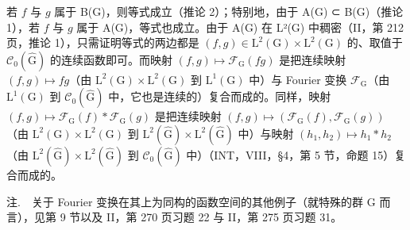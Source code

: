 若 \(f\) 与 \(g\) 属于 B(G)，则等式成立（推论 2）；特别地，由于 A(G) ⊂ B(G)（推论 1），若 \(f\) 与 \(g\) 属于 A(G)，等式也成立。由于 A(G) 在 L²(G) 中稠密（II，第 212 页，推论 1），只需证明等式的两边都是 \((f,g)\in\mathrm{L}^{2}(\mathrm{G})\times\mathrm{L}^{2}(\mathrm{G})\) 的、取值于 \(\mathcal{C}_{0}(\widehat{\mathrm{G}})\) 的连续函数即可。而映射 \((f,g)\mapsto\mathcal{F}_{\mathrm{G}}(fg)\) 是把连续映射 \((f,g)\mapsto fg\)（由 \(\mathrm{L}^{2}(\mathrm{G})\times\mathrm{L}^{2}(\mathrm{G})\) 到 \(\mathrm{L}^{1}(\mathrm{G})\) 中）与 Fourier 变换 \(\mathcal{F}_{\mathrm{G}}\)（由 \(\mathrm{L}^{1}(\mathrm{G})\) 到 \(\mathcal{C}_{0}(\widehat{\mathrm{G}})\) 中，它也是连续的）复合而成的。同样，映射 \((f,g)\mapsto\mathcal{F}_{\mathrm{G}}(f)*\mathcal{F}_{\mathrm{G}}(g)\) 是把连续映射 \((f,g)\mapsto(\mathcal{F}_{\mathrm{G}}(f),\mathcal{F}_{\mathrm{G}}(g))\)（由 \(\mathrm{L}^{2}(\mathrm{G})\times\mathrm{L}^{2}(\mathrm{G})\) 到 \(\mathrm{L}^{2}(\widehat{\mathrm{G}})\times\mathrm{L}^{2}(\widehat{\mathrm{G}})\) 中）与映射 \((h_{1},h_{2})\mapsto h_{1}*h_{2}\)（由 \(\mathrm{L}^{2}(\widehat{\mathrm{G}})\times\mathrm{L}^{2}(\widehat{\mathrm{G}})\) 到 \(\mathcal{C}_{0}(\widehat{\mathrm{G}})\) 中）（INT，VIII，§4，第 5 节，命题 15）复合而成的。

注.　关于 Fourier 变换在其上为同构的函数空间的其他例子（就特殊的群 G 而言），见第 9 节以及 II，第 270 页习题 22 与 II，第 275 页习题 31。


